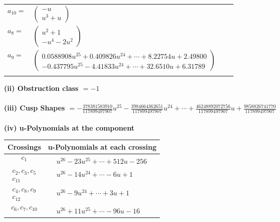 \documentclass[1p]{elsarticle_modified}
\theoremstyle{definition}
\begin{document}
\begin{tabular}{m{7pt} m{180pt} m{7pt} m{180pt} }
\flushright $a_{10}=$&$\begin{pmatrix}- u\\u^3+u\end{pmatrix}$ \\
\flushright $a_{8}=$&$\begin{pmatrix}u^2+1\\- u^4-2 u^2\end{pmatrix}$ \\
\flushright $a_{9}=$&$\begin{pmatrix}0.0588908 u^{25}+0.409826 u^{24}+\cdots+8.22754 u+2.49800\\-0.437795 u^{25}-4.41833 u^{24}+\cdots+32.6510 u+6.31789\end{pmatrix}$\\&\end{tabular}
\flushleft \textbf{(ii) Obstruction class $= -1$}\\~\\
\flushleft \textbf{(iii) Cusp Shapes $= -\frac{378381583910}{117899497907} u^{25}-\frac{3984664362651}{117899497907} u^{24}+\cdots+\frac{46248892072756}{117899497907} u+\frac{9858826741770}{117899497907}$}\\~\\
\newpage\renewcommand{\arraystretch}{1}
\flushleft \textbf{(iv) u-Polynomials at the component}\newline \\
\begin{tabular}{m{50pt}|m{274pt}}
Crossings & \hspace{64pt}u-Polynomials at each crossing \\
\hline $$\begin{aligned}c_{1}\end{aligned}$$&$\begin{aligned}
&u^{26}-23 u^{25}+\cdots+512 u-256
\end{aligned}$\\
\hline $$\begin{aligned}c_{2},c_{3},c_{5}\\c_{11}\end{aligned}$$&$\begin{aligned}
&u^{26}-14 u^{24}+\cdots-6 u+1
\end{aligned}$\\
\hline $$\begin{aligned}c_{4},c_{8},c_{9}\\c_{12}\end{aligned}$$&$\begin{aligned}
&u^{26}-9 u^{24}+\cdots+3 u+1
\end{aligned}$\\
\hline $$\begin{aligned}c_{6},c_{7},c_{10}\end{aligned}$$&$\begin{aligned}
&u^{26}+11 u^{25}+\cdots-96 u-16
\end{aligned}$\\
\hline
\end{tabular}\\~\\
\end{document}
